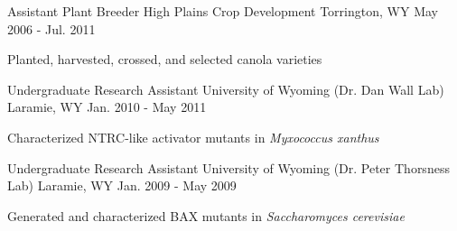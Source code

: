 \begin{cventries}
  \cventry
    {Assistant Plant Breeder} %
    {High Plains Crop Development} %
    {Torrington, WY} %
    {May 2006 - Jul. 2011} %
    {
      \begin{cvitems} %
        \item {Planted, harvested, crossed, and selected canola varieties}
      \end{cvitems}
    }

  \cventry
    {Undergraduate Research Assistant} %
    {University of Wyoming (Dr. Dan Wall Lab)} %
    {Laramie, WY} %
    {Jan. 2010 - May 2011} %
    {
      \begin{cvitems} %
        \item {Characterized NTRC-like activator mutants in \textit{Myxococcus xanthus}}
      \end{cvitems}
    }

  \cventry
    {Undergraduate Research Assistant} %
    {University of Wyoming (Dr. Peter Thorsness Lab)} %
    {Laramie, WY} %
    {Jan. 2009 - May 2009} %
    {
      \begin{cvitems} %
        \item {Generated and characterized BAX mutants in \textit{Saccharomyces cerevisiae}}
      \end{cvitems}
    }

\end{cventries}
